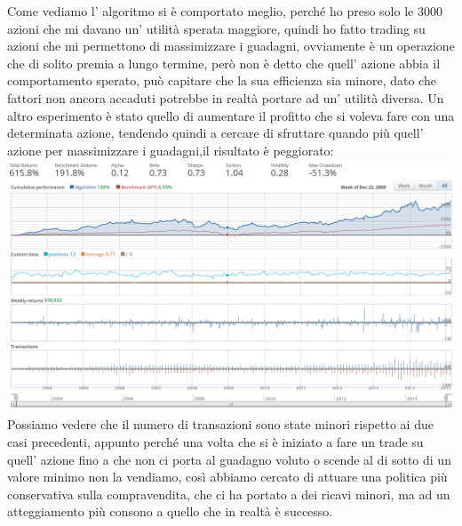 			Come vediamo l' algoritmo si è comportato meglio, perché ho preso solo le 3000 azioni che mi davano un' utilità sperata maggiore, quindi ho fatto trading su azioni che mi permettono di massimizzare i guadagni, ovviamente è un operazione che di solito premia a lungo termine, però non è detto che quell' azione abbia il comportamento sperato, può capitare che la sua efficienza sia minore, dato che fattori non ancora accaduti potrebbe in realtà portare ad un' utilità diversa.
			Un altro esperimento è stato quello di aumentare il profitto che si voleva fare con una determinata azione, tendendo quindi a cercare di sfruttare quando più quell' azione per massimizzare i guadagni,il risultato è peggiorato:
			\includegraphics[width=1.0\textwidth, height=0.40\textheight]{stock2.png} 
			Possiamo vedere che il numero di transazioni sono state minori rispetto ai due casi precedenti, appunto perché una volta che si è iniziato a fare un trade su quell' azione fino a che non ci porta al guadagno voluto o scende al di sotto di un valore minimo non la vendiamo, così abbiamo cercato di attuare una politica più conservativa sulla compravendita, che ci ha portato a dei ricavi minori, ma ad un atteggiamento più consono a quello che in realtà è successo.